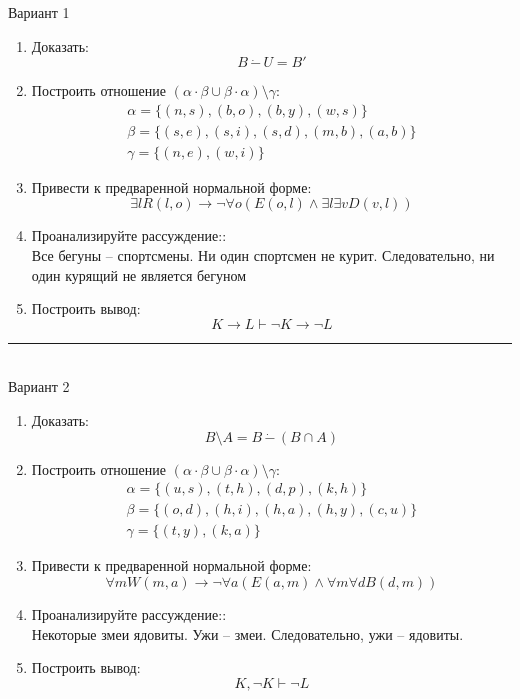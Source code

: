 \documentclass[10pt,a4paper]{article}
\begin{document}
\pagebreak

\begin{multicols}{2}
Вариант 1
\begin{enumerate}
\item Доказать:
$$B\,\dot{-}\,U=B'$$
\item Построить отношение $(\alpha\cdot\beta\cup\beta\cdot\alpha)\setminus\gamma$:
$$\begin{array}{l} \alpha=\{ (n, s), (b, o), (b, y), (w, s) \} \\ \beta=\{ (s, e), (s, i), (s, d), (m, b), (a, b) \} \\ \gamma=\{ (n, e), (w, i) \} \end{array}$$
\item Привести к предваренной нормальной форме: \:\\
$$\exists lR(l,o) \to \neg \forall o( E(o,l) \wedge \exists l\exists v D(v, l))$$
\item Проанализируйте рассуждение::\\
Все бегуны -- спортсмены. Ни один спортсмен не курит. Следовательно, ни один курящий не является бегуном
\item Построить вывод:\\
$$K \to L \vdash \neg K \to \neg L$$
\end{enumerate}
\noindent\rule{\columnwidth}{0.1pt} \\

Вариант 2
\begin{enumerate}
\item Доказать:
$$B\setminus A = B\,\dot{-}\,(B\cap A)$$
\item Построить отношение $(\alpha\cdot\beta\cup\beta\cdot\alpha)\setminus\gamma$:
$$\begin{array}{l} \alpha=\{ (u, s), (t, h), (d, p), (k, h) \} \\ \beta=\{ (o, d), (h, i), (h, a), (h, y), (c, u) \} \\ \gamma=\{ (t, y), (k, a) \} \end{array}$$
\item Привести к предваренной нормальной форме: \:\\
$$\forall mW(m,a) \to \neg \forall a( E(a,m) \wedge \forall m\forall d B(d, m))$$
\item Проанализируйте рассуждение::\\
Некоторые змеи ядовиты. Ужи -- змеи. Следовательно, ужи -- ядовиты. 
\item Построить вывод:\\
$$K, \neg K \vdash \neg L$$
\end{enumerate}


\end{multicols}
\end{document}
